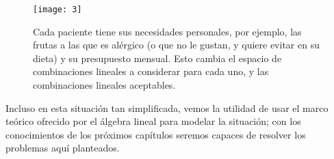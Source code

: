 \begin{figure}[H]
\centering\captionsetup{format = hang}
	\begin{measuredfigure}
		\texttt{[image: 3]} 
		\caption{Cada paciente tiene sus necesidades personales,
		por ejemplo, las frutas a las que es alérgico (o que no le
		gustan, y quiere evitar en su dieta) y su presupuesto mensual.
		Esto cambia el espacio de combinaciones lineales a considerar
		para cada uno, y las combinaciones lineales aceptables.}
 	\end{measuredfigure}
 \end{figure}

Incluso en esta situación tan simplificada, vemos la utilidad
de usar el marco teórico ofrecido por el álgebra lineal para
modelar la situación; con los conocimientos de los próximos
capítulos seremos capaces de resolver los problemas
aquí planteados. 
